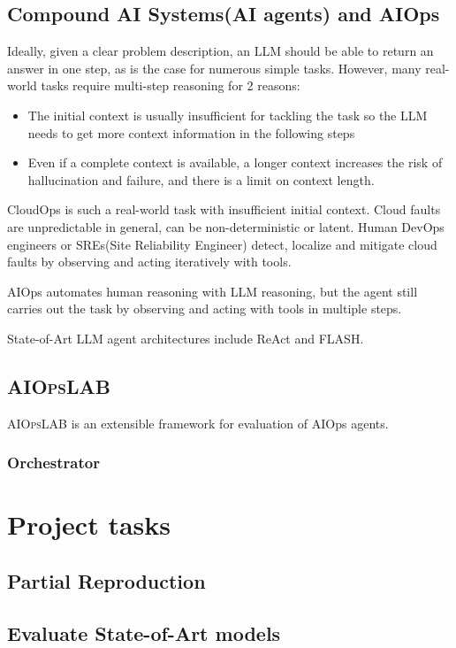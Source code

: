 \documentclass[conference]{IEEEtran}
\begin{document}
\subsection{Compound AI Systems(AI agents) and AIOps}
Ideally, given a clear problem description, an LLM should be able to return an answer in one step, as is the case for numerous simple tasks. However, many real-world tasks require multi-step reasoning for 2 reasons: 
        \begin{itemize}
                \item The initial context is usually insufficient for tackling the task so the LLM needs to get more context information in the following steps  
                \item Even if a complete context is available, a longer context increases the risk of hallucination and failure, and there is a limit on context length.
        \end{itemize}

        CloudOps is such a real-world task with insufficient initial context. Cloud faults are unpredictable in general, can be non-deterministic or latent. Human DevOps engineers or SREs(Site Reliability Engineer) detect, localize and mitigate cloud faults by observing and acting iteratively with tools. 

        AIOps automates human reasoning with LLM reasoning, but the agent still carries out the task by observing and acting with tools in multiple steps.     

        State-of-Art LLM agent architectures include ReAct\cite{yao2023reactsynergizingreasoningacting} and FLASH\cite{zhang2024flash}.

\subsection{\textsc{AIOps}LAB}
\textsc{AIOps}LAB\cite{chen2025aiopslab} is an extensible framework for evaluation of AIOps agents. 

\subsubsection{Orchestrator}


\section{Project tasks}

\subsection{Partial Reproduction}
\subsection{Evaluate State-of-Art models}








\vspace{12pt}
\end{document}
